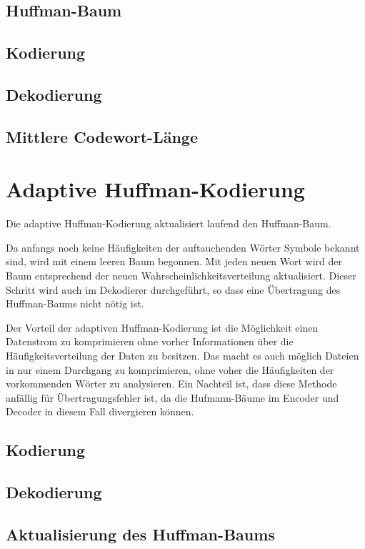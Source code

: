 \documentclass[twoside,graphics,11pt,dvips]{article}
\theoremstyle{break}
\begin{document}
\subsection{Huffman-Baum}

\subsection{Kodierung}

\subsection{Dekodierung}

\subsection{Mittlere Codewort-Länge}


\section{Adaptive Huffman-Kodierung}
Die adaptive Huffman-Kodierung aktualisiert laufend den Huffman-Baum.

Da anfangs noch keine Häufigkeiten der auftauchenden Wörter Symbole
bekannt sind, wird mit einem leeren Baum begonnen. Mit jeden neuen
Wort wird der Baum entsprechend der neuen
Wahrscheinlichkeitsverteilung aktualisiert. Dieser Schritt wird auch
im Dekodierer durchgeführt, so dass eine Übertragung des Huffman-Baums
nicht nötig ist.

Der Vorteil der adaptiven Huffman-Kodierung ist die Möglichkeit einen
Datenstrom zu komprimieren ohne vorher Informationen über die
Häufigkeitsverteilung der Daten zu besitzen. Das macht es auch möglich
Dateien in nur einem Durchgang zu komprimieren, ohne voher die
Häufigkeiten der vorkommenden Wörter zu analysieren. Ein Nachteil ist,
dass diese Methode anfällig für Übertragungsfehler ist, da die
Hufmann-Bäume im Encoder und Decoder in diesem Fall divergieren können.

\subsection{Kodierung}

\subsection{Dekodierung}

\subsection{Aktualisierung des Huffman-Baums}
\end{document}
